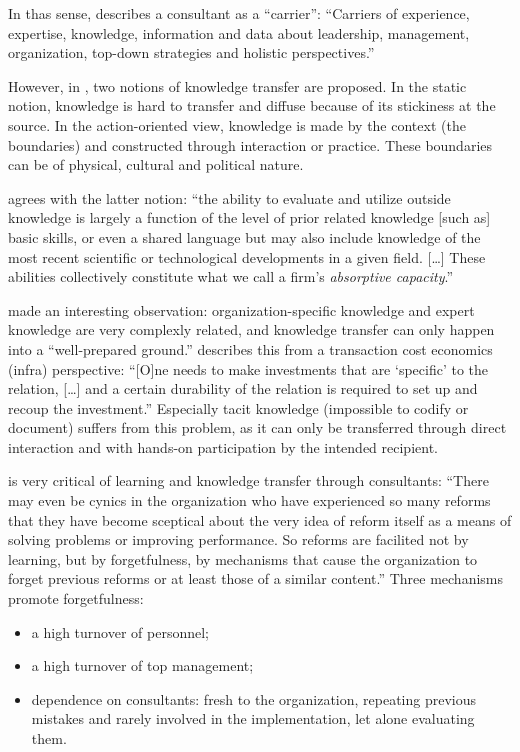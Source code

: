 \documentclass[12pt]{article}
\begin{document}
In thas sense, \citet[269]{furusten2009} describes a consultant as a
``carrier'': ``Carriers of experience, expertise, knowledge, information
and data about leadership, management, organization, top-down strategies
and holistic perspectives.''

However, in \citet[633]{sturdy2009}, two notions of knowledge transfer
are proposed. In the static notion, knowledge is hard to transfer and
diffuse because of its stickiness at the source. In the action-oriented
view, knowledge is made by the context (the boundaries) and constructed
through interaction or practice. These boundaries can be of physical,
cultural and political nature.

\citet[128-129]{cohen1990} agrees with the latter notion: ``the ability
to evaluate and utilize outside knowledge is largely a function of the
level of prior related knowledge {[}such as{]} basic skills, or even a
shared language but may also include knowledge of the most recent
scientific or technological developments in a given field. {[}\ldots{]}
These abilities collectively constitute what we call a firm's
\emph{absorptive capacity}.''

\citet[84]{fincham2002} made an interesting observation:
organization-specific knowledge and expert knowledge are very complexly
related, and knowledge transfer can only happen into a ``well-prepared
ground.'' \citet[922]{nooteboom2000} describes this from a transaction
cost economics (infra) perspective: ``{[}O{]}ne needs to make
investments that are `specific' to the relation, {[}\ldots{]} and a
certain durability of the relation is required to set up and recoup the
investment.'' Especially tacit knowledge (impossible to codify or
document) suffers from this problem, as it can only be transferred
through direct interaction and with hands-on participation by the
intended recipient.

\citet[41-42]{brunson1993} is very critical of learning and knowledge
transfer through consultants: ``There may even be cynics in the
organization who have experienced so many reforms that they have become
sceptical about the very idea of reform itself as a means of solving
problems or improving performance. So reforms are facilited not by
learning, but by forgetfulness, by mechanisms that cause the
organization to forget previous reforms or at least those of a similar
content.'' Three mechanisms promote forgetfulness:

\begin{itemize}
\item
  a high turnover of personnel;
\item
  a high turnover of top management;
\item
  dependence on consultants: fresh to the organization, repeating
  previous mistakes and rarely involved in the implementation, let alone
  evaluating them.
\end{itemize}
\end{document}
